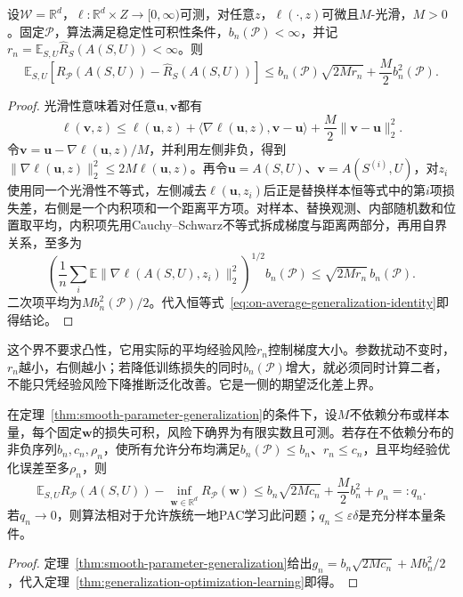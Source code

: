 \begin{theorem}[光滑损失下参数稳定性与期望泛化差]
\label{thm:smooth-parameter-generalization}
设$\mathcal W=\mathbb R^d$，$\ell:\mathbb R^d\times Z\to[0,\infty)$可测，对任意$z$，$\ell(\cdot,z)$可微且$M$-光滑，$M>0$。固定$\mathcal P$，算法满足稳定性可积性条件，$b_n(\mathcal P)<\infty$，并记$r_n=\mathbb E_{S,U}\hat R_S(A(S,U))<\infty$。则
\begin{equation}
 \mathbb E_{S,U}[R_{\mathcal P}(A(S,U))-\hat R_S(A(S,U))]\leq b_n(\mathcal P)\sqrt{2Mr_n}+\frac M2 b_n^2(\mathcal P).
 \label{eq:smooth-parameter-generalization}
\end{equation}
\end{theorem}
\begin{proof}
光滑性意味着对任意$\bm u,\bm v$都有
\[
 \ell(\bm v,z)\leq\ell(\bm u,z)+\langle\nabla\ell(\bm u,z),\bm v-\bm u\rangle+\frac M2\|\bm v-\bm u\|_2^2.
\]
令$\bm v=\bm u-\nabla\ell(\bm u,z)/M$，并利用左侧非负，得到$\|\nabla\ell(\bm u,z)\|_2^2\leq2M\ell(\bm u,z)$。再令$\bm u=A(S,U)$、$\bm v=A(S^{(i)},U)$，对$z_i$使用同一个光滑性不等式，左侧减去$\ell(\bm u,z_i)$后正是替换样本恒等式中的第$i$项损失差，右侧是一个内积项和一个距离平方项。对样本、替换观测、内部随机数和位置取平均，内积项先用Cauchy--Schwarz不等式拆成梯度与距离两部分，再用自界关系，至多为
\[
 \left(\frac1n\sum_i\mathbb E\|\nabla\ell(A(S,U),z_i)\|_2^2\right)^{1/2}b_n(\mathcal P)\leq\sqrt{2Mr_n}\,b_n(\mathcal P).
\]
二次项平均为$Mb_n^2(\mathcal P)/2$。代入恒等式~\eqref{eq:on-average-generalization-identity}即得结论。
\end{proof}

这个界不要求凸性，它用实际的平均经验风险$r_n$控制梯度大小。参数扰动不变时，$r_n$越小，右侧越小；若降低训练损失的同时$b_n(\mathcal P)$增大，就必须同时计算二者，不能只凭经验风险下降推断泛化改善。它是一侧的期望泛化差上界。

\begin{theorem}[光滑损失下参数稳定性与可学习性]
\label{thm:smooth-parameter-learning}
在定理~\ref{thm:smooth-parameter-generalization}的条件下，设$M$不依赖分布或样本量，每个固定$\bm w$的损失可积，风险下确界为有限实数且可测。若存在不依赖分布的非负序列$b_n,c_n,\rho_n$，使所有允许分布均满足$b_n(\mathcal P)\leq b_n$、$r_n\leq c_n$，且平均经验优化误差至多$\rho_n$，则
\[
 \mathbb E_{S,U}R_{\mathcal P}(A(S,U))-\inf_{\bm w\in\mathbb R^d}R_{\mathcal P}(\bm w)\leq b_n\sqrt{2Mc_n}+\frac M2b_n^2+\rho_n=:q_n.
\]
若$q_n\to0$，则算法相对于允许族统一地PAC学习此问题；$q_n\leq\varepsilon\delta$是充分样本量条件。
\end{theorem}
\begin{proof}
定理~\ref{thm:smooth-parameter-generalization}给出$g_n=b_n\sqrt{2Mc_n}+Mb_n^2/2$，代入定理~\ref{thm:generalization-optimization-learning}即得。
\end{proof}

